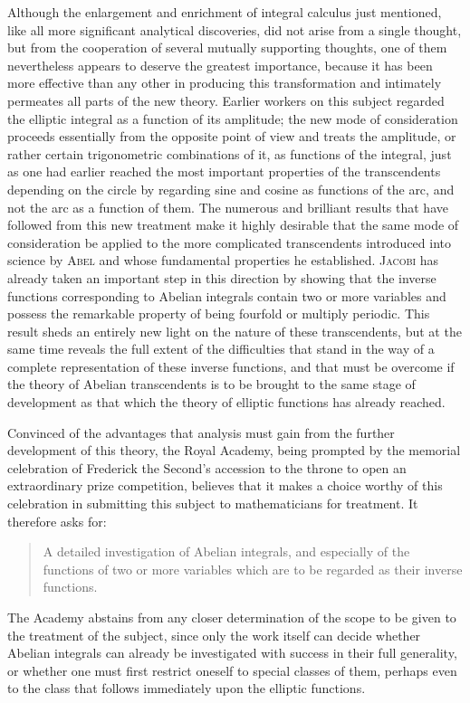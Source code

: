 \documentclass[11pt]{article}
\newcommand{\scn}[1]{\textsc{#1}}
\begin{document}
Although the enlargement and enrichment of integral calculus just mentioned, like all more significant analytical discoveries, did not arise from a single thought, but from the cooperation of several mutually supporting thoughts, one of them nevertheless appears to deserve the greatest importance, because it has been more effective than any other in producing this transformation and intimately permeates all parts of the new theory. Earlier workers on this subject regarded the elliptic integral as a function of its amplitude; the new mode of consideration proceeds essentially from the opposite point of view and treats the amplitude, or rather certain trigonometric combinations of it, as functions of the integral, just as one had earlier reached the most important properties of the transcendents depending on the circle by regarding sine and cosine as functions of the arc, and not the arc as a function of them. The numerous and brilliant results that have followed from this new treatment make it highly desirable that the same mode of consideration be applied to the more complicated transcendents introduced into science by \scn{Abel} and whose fundamental properties he established. \scn{Jacobi} has already taken an important step in this direction by showing that the inverse functions corresponding to Abelian integrals contain two or more variables and possess the remarkable property of being fourfold or multiply periodic. This result sheds an entirely new light on the nature of these transcendents, but at the same time reveals the full extent of the difficulties that stand in the way of a complete representation of these inverse functions, and that must be overcome if the theory of Abelian transcendents is to be brought to the same stage of development as that which the theory of elliptic functions has already reached.

Convinced of the advantages that analysis must gain from the further development of this theory, the Royal Academy, being prompted by the memorial celebration of Frederick the Second's accession to the throne to open an extraordinary prize competition, believes that it makes a choice worthy of this celebration in submitting this subject to mathematicians for treatment. It therefore asks for:

\begin{quote}
A detailed investigation of Abelian integrals, and especially of the functions of two or more variables which are to be regarded as their inverse functions.
\end{quote}

The Academy abstains from any closer determination of the scope to be given to the treatment of the subject, since only the work itself can decide whether Abelian integrals can already be investigated with success in their full generality, or whether one must first restrict oneself to special classes of them, perhaps even to the class that follows immediately upon the elliptic functions.
\end{document}
